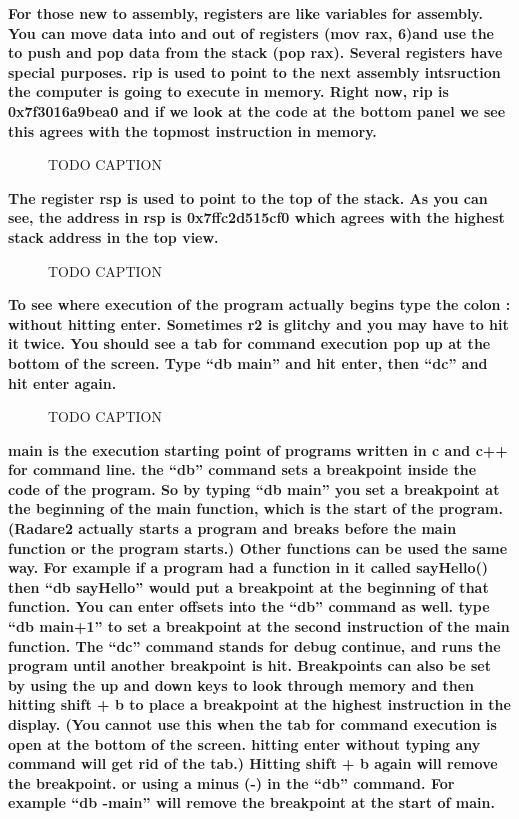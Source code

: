 \documentclass[letterpaper]{article}
\newcommand{\sitfig}[3]{
\begin{figure}[H]
\centering
\makebox[\textwidth][c]{
#2
}
\caption{#3}
\label{#1}
\end{figure}
}
\newcommand{\sitgfx}[4][scale=1.0]{
\sitfig{#3}{\texttt{[image: \#2]}}{#4}
}
\begin{document}
\textbf{For those new to assembly, registers are like variables for assembly. You can move data into and out of
registers (mov rax, 6)and use the to push and pop data from the stack (pop rax). Several registers have special
purposes. rip is used to point to the next assembly intsruction the computer is going to execute in memory. Right now,
rip is 0x7f3016a9bea0 and if we look at the code at the bottom panel we see this agrees with the topmost instruction in
memory.}

  
\sitgfx[width=5.8335in,height=3.6457in]{FINALWORKINGDOCFORMERLYPRECURSOR-img078.png}{fig:unk}{TODO CAPTION}
 

\textbf{The register rsp is used to point to the top of the stack. As you can see, the address in rsp is 0x7ffc2d515cf0
which agrees with the highest stack address in the top view.}

  
\sitgfx[width=5.8335in,height=3.6457in]{FINALWORKINGDOCFORMERLYPRECURSOR-img079.png}{fig:unk}{TODO CAPTION}
 

\textbf{To see where execution of the program actually begins type the colon : without hitting enter. Sometimes r2 is
glitchy and you may have to hit it twice. You should see a tab for command execution pop up at the bottom of the
screen. Type ``db main'' and hit enter, then ``dc'' and hit enter again.}

  
\sitgfx[width=5.8335in,height=3.6457in]{FINALWORKINGDOCFORMERLYPRECURSOR-img080.png}{fig:unk}{TODO CAPTION}
 

\textbf{main is the execution starting point of programs written in c and c++ for command line. the ``db'' command sets
a breakpoint inside the code of the program. So by typing ``db main'' you set a breakpoint at the beginning of the main
function, which is the start of the program. (Radare2 actually starts a program and breaks before the main function or
the program starts.) Other functions can be used the same way. For example if a program had a function in it called
sayHello() then ``db sayHello'' would put a breakpoint at the beginning of that function. You can enter offsets into
the ``db'' command as well. type ``db main+1'' to set a breakpoint at the second instruction of the main function. The
``dc'' command stands for debug continue, and runs the program until another breakpoint is hit. Breakpoints can also be
set by using the up and down keys to look through memory and then hitting shift + b to place a breakpoint at the
highest instruction in the display. (You cannot use this when the tab for command execution is open at the bottom of
the screen. hitting enter without typing any command will get rid of the tab.) Hitting shift + b again will remove the
breakpoint. or using a minus (-) in the ``db'' command. For example ``db -main'' will remove the breakpoint at the
start of main.}
\end{document}
